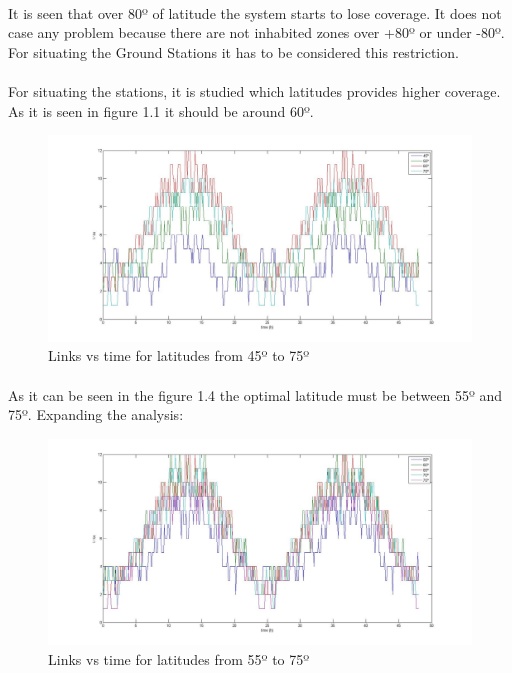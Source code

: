 \documentclass[12pt,a4paper]{report}
\begin{document}
\paragraph{}
It is seen that over 80º of latitude the system starts to lose coverage. It does not case any problem because there are not inhabited zones over +80º or under -80º. For situating the Ground Stations it has to be considered this restriction.
\paragraph{}
For situating the stations, it is studied which latitudes provides higher coverage. As it is seen in figure 1.1 it should be around 60º.

\begin{figure}[H]
\begin{center}
\includegraphics[scale=0.30]{45_10_75_lat.jpg}
\caption{Links vs time for latitudes from 45º to 75º}
\end{center}
\end{figure}

\paragraph{}
As it can be seen in the figure 1.4 the optimal latitude must be between 55º and 75º. Expanding the analysis:

\begin{figure}[H]
\begin{center}
\includegraphics[scale=0.30]{55_5_75_lat.jpg}
\caption{Links vs time for latitudes from 55º to 75º}
\end{center}
\end{figure}
\end{document}

